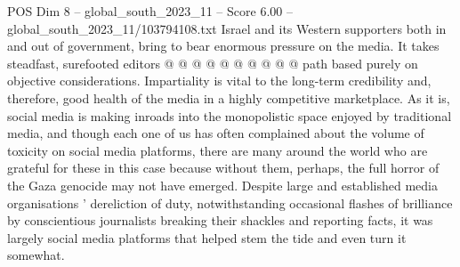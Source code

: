\begin{textsample}{POS Dim 8 – global\_south\_2023\_11 – Score 6.00 – global\_south\_2023\_11/103794108.txt}
Israel and its Western supporters both in and out of government, bring to bear enormous pressure on the media.
It takes steadfast, surefooted editors @ @ @ @ @ @ @ @ @ @ path based purely on objective considerations.
Impartiality is vital to the long-term credibility and, therefore, good health of the media in a highly competitive marketplace.
As it is, social media is making inroads into the monopolistic space enjoyed by traditional media, and though each one of us has often complained about the volume of toxicity on social media platforms, there are many around the world who are grateful for these in this case because without them, perhaps, the full horror of the Gaza genocide may not have emerged.
Despite large and established media organisations ' dereliction of duty, notwithstanding occasional flashes of brilliance by conscientious journalists breaking their shackles and reporting facts, it was largely social media platforms that helped stem the tide and even turn it somewhat.

\end{textsample}
